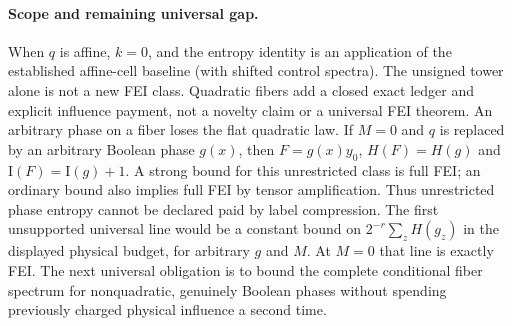 \documentclass[11pt]{article}
\newcommand{\I}{\mathrm I}
\begin{document}
\paragraph{Scope and remaining universal gap.}
When $q$ is affine, $k=0$, and the entropy identity is an application
of the established affine-cell baseline (with shifted control spectra).
The unsigned tower alone is not a new FEI class. Quadratic fibers add
a closed exact ledger and explicit influence payment, not a novelty
claim or a universal FEI theorem. An arbitrary phase on a fiber loses
the flat quadratic law. If $M=0$ and $q$ is replaced by an arbitrary
Boolean phase $g(x)$, then $F=g(x)y_0$, $H(F)=H(g)$ and
$\I(F)=\I(g)+1$. A strong bound for this unrestricted class is full FEI;
an ordinary bound also implies full FEI by tensor amplification. Thus
unrestricted phase entropy cannot be declared paid by label compression.
The first unsupported universal line would be a constant bound on
$2^{-r}\sum_zH(g_z)$ in the displayed physical budget, for arbitrary
$g$ and $M$. At $M=0$ that line is exactly FEI. The next universal
obligation is to bound the complete conditional fiber spectrum for
nonquadratic, genuinely Boolean phases without spending previously
charged physical influence a second time.
\end{document}
